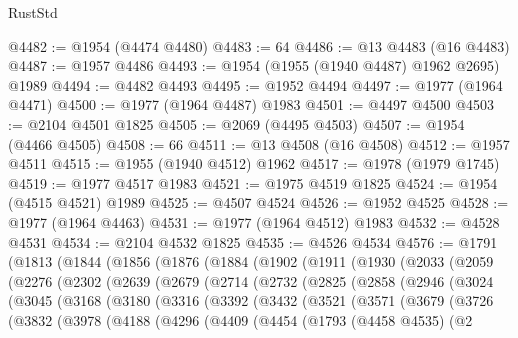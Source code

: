\begin{lexlean}{RustStd}
\begin{coremodule}
@4482 := @1954 (@4474 @4480)
@4483 := 64
@4486 := @13 @4483 (@16 @4483)
@4487 := @1957 @4486
@4493 := @1954 (@1955 (@1940 @4487) @1962 @2695) @1989
@4494 := @4482 @4493
@4495 := @1952 @4494
@4497 := @1977 (@1964 @4471)
@4500 := @1977 (@1964 @4487) @1983
@4501 := @4497 @4500
@4503 := @2104 @4501 @1825
@4505 := @2069 (@4495 @4503)
@4507 := @1954 (@4466 @4505)
@4508 := 66
@4511 := @13 @4508 (@16 @4508)
@4512 := @1957 @4511
@4515 := @1955 (@1940 @4512) @1962
@4517 := @1978 (@1979 @1745)
@4519 := @1977 @4517 @1983
@4521 := @1975 @4519 @1825
@4524 := @1954 (@4515 @4521) @1989
@4525 := @4507 @4524
@4526 := @1952 @4525
@4528 := @1977 (@1964 @4463)
@4531 := @1977 (@1964 @4512) @1983
@4532 := @4528 @4531
@4534 := @2104 @4532 @1825
@4535 := @4526 @4534
@4576 := @1791
    (@1813
      (@1844
        (@1856
          (@1876
            (@1884
              (@1902
                (@1911
                  (@1930
                    (@2033
                      (@2059
                        (@2276
                          (@2302
                            (@2639
                              (@2679
                                (@2714
                                  (@2732
                                    (@2825
                                      (@2858
                                        (@2946
                                          (@3024
                                            (@3045
                                              (@3168
                                                (@3180
                                                  (@3316
                                                    (@3392
                                                      (@3432
                                                        (@3521
                                                          (@3571
                                                            (@3679
                                                              (@3726
                                                                (@3832
                                                                  (@3978
                                                                    (@4188
                                                                      (@4296
                                                                        (@4409
                                                                          (@4454
                                                                            (@1793
                                                                              (@4458 @4535)
                                                                              (@2

\end{coremodule}
\end{lexlean}
